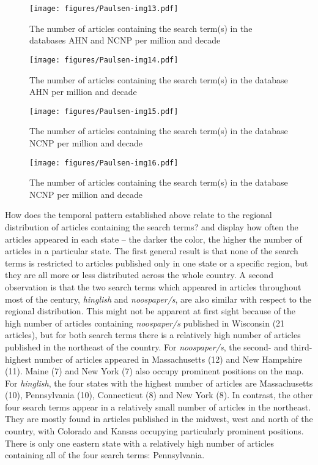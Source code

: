 \begin{figure}
\texttt{[image: figures/Paulsen-img13.pdf]}
\caption{
The number of articles containing the search term(s) in the databases AHN and NCNP per million and decade
}
\label{fig:key:13}
\end{figure}


\begin{figure}
\texttt{[image: figures/Paulsen-img14.pdf]}
\caption{
The number of articles containing the search term(s) in the database AHN per million and decade
}
\label{fig:key:14}
\end{figure}


\begin{figure}
\texttt{[image: figures/Paulsen-img15.pdf]}
\caption{
The number of articles containing the search term(s) in the database NCNP per million and decade
}
\label{fig:key:15}
\end{figure}


\begin{figure}
\texttt{[image: figures/Paulsen-img16.pdf]}
\caption{
The number of articles containing the search term(s) in the database NCNP per million and decade
}
\label{fig:key:16}
\end{figure}


How does the temporal pattern established above relate to the regional distribution of articles containing the search terms?  and  display how often the articles appeared in each state – the darker the color, the higher the number of articles in a particular state. The first general result is that none of the search terms is restricted to articles published only in one state or a specific region, but they are all more or less distributed across the whole country. A second observation is that the two search terms which appeared in articles throughout most of the century, \emph{hinglish} and \emph{noospaper/s}, are also similar with respect to the regional distribution. This might not be apparent at first sight because of the high number of articles containing \emph{noospaper/s} published in Wisconsin (21 articles), but for both search terms there is a relatively high number of articles published in the northeast of the country. For \emph{noospaper/s}, the second- and third\--highest number of articles appeared in Massachusetts (12) and New Hampshire (11). Maine (7) and New York (7) also occupy prominent positions on the map. For \emph{hinglish}, the four states with the highest number of articles are Massachusetts (10), Pennsylvania (10), Connecticut (8) and New York (8). In contrast, the other four search terms appear in a relatively small number of articles in the northeast. They are mostly found in articles published in the midwest, west and north of the country, with Colorado and Kansas occupying particularly prominent positions. There is only one eastern state with a relatively high number of articles containing all of the four search terms: Pennsylvania.


